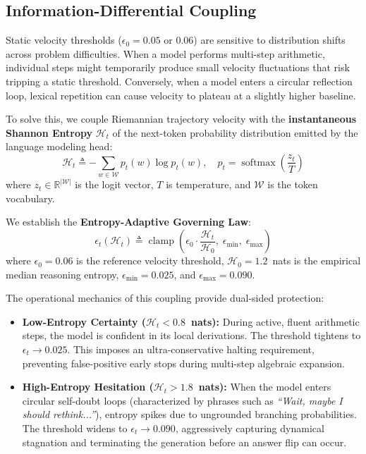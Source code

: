 \documentclass[10pt,twocolumn]{article}
\begin{document}
\subsection{Information-Differential Coupling}
\label{sec:entropy}
Static velocity thresholds ($\epsilon_0 = 0.05$ or $0.06$) are sensitive to distribution shifts across problem difficulties. When a model performs multi-step arithmetic, individual steps might temporarily produce small velocity fluctuations that risk tripping a static threshold. Conversely, when a model enters a circular reflection loop, lexical repetition can cause velocity to plateau at a slightly higher baseline.

To solve this, we couple Riemannian trajectory velocity with the \textbf{instantaneous Shannon Entropy} $\mathcal{H}_t$ of the next-token probability distribution emitted by the language modeling head:
\begin{equation}
    \mathcal{H}_t \triangleq -\sum_{w \in \mathcal{W}} p_t(w) \log p_t(w), \quad p_t = \operatorname{softmax}\left(\frac{z_t}{T}\right)
\end{equation}
where $z_t \in \mathbb{R}^{|\mathcal{W}|}$ is the logit vector, $T$ is temperature, and $\mathcal{W}$ is the token vocabulary.

We establish the \textbf{Entropy-Adaptive Governing Law}:
\begin{equation}
    \epsilon_t(\mathcal{H}_t) \triangleq \operatorname{clamp}\left( \epsilon_0 \cdot \frac{\mathcal{H}_t}{\mathcal{H}_0}, \; \epsilon_{\min}, \; \epsilon_{\max} \right)
\end{equation}
where $\epsilon_0 = 0.06$ is the reference velocity threshold, $\mathcal{H}_0 = 1.2$~nats is the empirical median reasoning entropy, $\epsilon_{\min} = 0.025$, and $\epsilon_{\max} = 0.090$.

The operational mechanics of this coupling provide dual-sided protection:
\begin{itemize}
    \item \textbf{Low-Entropy Certainty ($\mathcal{H}_t < 0.8$~nats):} During active, fluent arithmetic steps, the model is confident in its local derivations. The threshold tightens to $\epsilon_t \to 0.025$. This imposes an ultra-conservative halting requirement, preventing false-positive early stops during multi-step algebraic expansion.
    \item \textbf{High-Entropy Hesitation ($\mathcal{H}_t > 1.8$~nats):} When the model enters circular self-doubt loops (characterized by phrases such as \emph{``Wait, maybe I should rethink...''}), entropy spikes due to ungrounded branching probabilities. The threshold widens to $\epsilon_t \to 0.090$, aggressively capturing dynamical stagnation and terminating the generation before an answer flip can occur.
\end{itemize}
\end{document}
